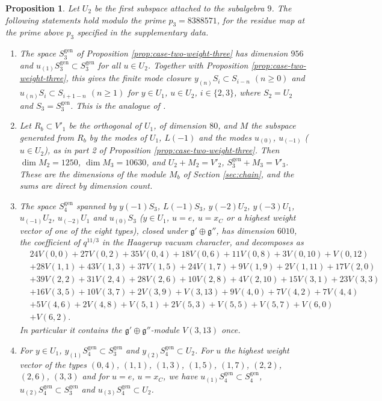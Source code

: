 \documentclass[leqno]{article}
\renewcommand{\geq}{\ensuremath{\geqslant}}
\newtheorem{prop}[thm]{Proposition}
\numberwithin{equation}{section}
\begin{document}
\begin{prop}
\label{prop:weight-three-four}
Let $U_2$ be the first subspace attached to the subalgebra $9$. The following statements hold modulo the prime $p_3 = 8388571$, for the residue map at the prime above $p_3$ specified in the supplementary data.
\begin{enumerate}
\item The space $S_3^{\mathrm{gen}}$ of Proposition \ref{prop:case-two-weight-three} has dimension $956$ and $u_{(1)}S_3^{\mathrm{gen}} \subset S_3^{\mathrm{gen}}$ for all $u \in U_2$. Together with Proposition \ref{prop:case-two-weight-three}, this gives the finite mode closure $y_{(n)}S_i \subset S_{i-n}$ $(n \geq 0)$ and $u_{(n)}S_i \subset S_{i+1-n}$ $(n \geq 1)$ for $y \in U_1$, $u \in U_2$, $i \in \{2,3\}$, where $S_2 = U_2$ and $S_3 = S_3^{\mathrm{gen}}$. This is the analogue of \cite[Proposition 4.1]{Rie26b}.
\item Let $R_b \subset V'_1$ be the orthogonal of $U_1$, of dimension $80$, and $M$ the subspace generated from $R_b$ by the modes of $U_1$, $L(-1)$ and the modes $u_{(0)}$, $u_{(-1)}$ ($u \in U_2$), as in part 2 of Proposition \ref{prop:case-two-weight-three}. Then $\dim M_2 = 1250$, $\dim M_3 = 10630$, and $U_2 + M_2 = V'_2$, $S_3^{\mathrm{gen}} + M_3 = V'_3$. These are the dimensions of the module $M_b$ of Section \ref{sec:chain}, and the sums are direct by dimension count.
\item The space $S_4^{\mathrm{gen}}$ spanned by $y(-1)S_3$, $L(-1)S_3$, $y(-2)U_2$, $y(-3)U_1$, $u_{(-1)}U_2$, $u_{(-2)}U_1$ and $u_{(0)}S_3$ ($y \in U_1$, $u = e$, $u = x_C$ or a highest weight vector of one of the eight types), closed under $\mathfrak g' \oplus \mathfrak g''$, has dimension $6010$, the coefficient of $q^{11/3}$ in the Haagerup vacuum character, and decomposes as
\[
\begin{aligned}
&24V(0,0)+27V(0,2)+35V(0,4)+18V(0,6)+11V(0,8)+3V(0,10)+V(0,12)\\
&+28V(1,1)+43V(1,3)+37V(1,5)+24V(1,7)+9V(1,9)+2V(1,11)+17V(2,0)\\
&+39V(2,2)+31V(2,4)+28V(2,6)+10V(2,8)+4V(2,10)+15V(3,1)+23V(3,3)\\
&+16V(3,5)+10V(3,7)+2V(3,9)+V(3,13)+9V(4,0)+7V(4,2)+7V(4,4)\\
&+5V(4,6)+2V(4,8)+V(5,1)+2V(5,3)+V(5,5)+V(5,7)+V(6,0)\\
&+V(6,2).
\end{aligned}
\]
In particular it contains the $\mathfrak g' \oplus \mathfrak g''$-module $V(3,13)$ once.
\item For $y \in U_1$, $y_{(1)}S_4^{\mathrm{gen}} \subset S_3^{\mathrm{gen}}$ and $y_{(2)}S_4^{\mathrm{gen}} \subset U_2$. For $u$ the highest weight vector of the types $(0,4)$, $(1,1)$, $(1,3)$, $(1,5)$, $(1,7)$, $(2,2)$, $(2,6)$, $(3,3)$ and for $u = e$, $u = x_C$, we have $u_{(1)}S_4^{\mathrm{gen}} \subset S_4^{\mathrm{gen}}$, $u_{(2)}S_4^{\mathrm{gen}} \subset S_3^{\mathrm{gen}}$ and $u_{(3)}S_4^{\mathrm{gen}} \subset U_2$.

\end{enumerate}
\end{prop}
\end{document}
